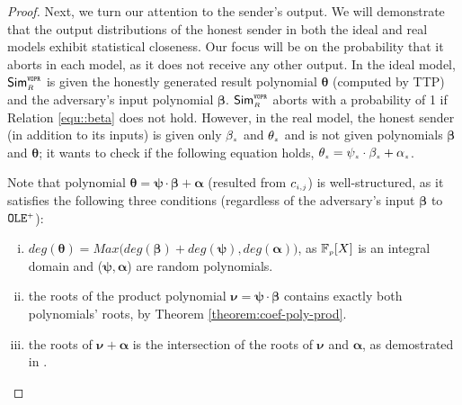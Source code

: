 \begin{proof}
Next, we turn our attention to the sender's output. We will demonstrate that the output distributions of the honest sender in both the ideal and real models exhibit statistical closeness. 
%
%
Our focus will be on the probability that it aborts in each model, as it does not receive any other output. In the ideal model, $\mathsf{Sim}^{\scriptscriptstyle \mathtt{VOPR}}_{\scriptscriptstyle R}$ is given the honestly generated result polynomial ${\bm \theta}$ (computed by TTP) and the adversary's input polynomial ${\bm \beta}$. $\mathsf{Sim}^{\scriptscriptstyle \mathtt{VOPR}}_{\scriptscriptstyle R}$ aborts with a probability of 1 if Relation \ref{equ::beta} does not hold. However, in the real model, the honest sender (in addition to its inputs) is given only $\beta_{\scriptscriptstyle  z}$ and $\theta_{\scriptscriptstyle  z}$ and is not given polynomials ${\bm\beta}$ and  ${\bm\theta}$; it wants to check if the following equation holds, $\theta_{\scriptscriptstyle z} =  \psi_{\scriptscriptstyle z}\cdot  \beta_{\scriptscriptstyle z}+ \alpha_{\scriptscriptstyle z}$. 

Note that polynomial $\bm\theta=\bm\psi\cdot \bm\beta+\bm\alpha$ (resulted from ${c}_{\scriptscriptstyle i,j}$) is well-structured, as it satisfies the following three conditions (regardless of the adversary's input $\bm\beta$ to $\mathtt{OLE}^{\scriptscriptstyle +}$): 
\begin{enumerate}[i.]

\item $deg(\bm\theta)=Max \Big(deg(\bm\beta)+deg(\bm\psi), deg(\bm\alpha) \Big)$, as $\mathbb{F}_{\scriptscriptstyle p}[X]$ is an integral domain and ($\bm\psi,\bm\alpha$) are random polynomials.

\item  the roots of the product polynomial $\bm\nu=\bm\psi\cdot \bm\beta$ contains exactly both polynomials' roots, by Theorem \ref{theorem:coef-poly-prod}.

\item  the roots of $\bm\nu+\bm\alpha$ is the intersection of the roots of $\bm\nu$ and $\bm\alpha$, as demostrated in \cite{DBLP:conf/crypto/KissnerS05}. 
 
 \end{enumerate}
 

\end{proof}
